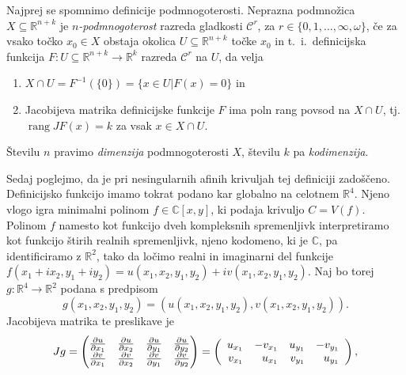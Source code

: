 \documentclass[mat1]{fmfdelo}
\newcommand{\tikzmark}[1]{\tikz[overlay,remember picture,baseline=(#1.base)]
  \node (#1) {\strut};}
\numberwithin{equation}{section}
\newcommand{\R}{\mathbb R}
\newcommand{\C}{\mathbb C}
\newcommand{\pdv}[2][]{\frac{\partial#1}{\partial#2}}
\DeclareMathOperator{\rang}{rang}
\theoremstyle{definition}
\begin{document}
\begin{dokaz}
    Najprej se spomnimo definicije podmnogoterosti. Neprazna podmnožica $X \subseteq \R^{n+k}$ je \emph{$n$-podmnogoterost} razreda gladkosti $\mathcal{C}^r$, za $r \in \{0,1,\dots, \infty, \omega\}$, če za vsako točko $x_0 \in X$ obstaja okolica $U \subseteq \R^{n+k}$ točke $x_0$ in t.~i.\ definicijska funkcija $F: U \subseteq \R^{n+k} \to \R^k$ razreda $\mathcal{C}^r$ na $U$, da velja
    \begin{enumerate}
        \item $X \cap U = F^{-1}(\{0\}) = \{x \in U | F(x) = 0\}$ in
        \item Jacobijeva matrika definicijske funkcije $F$ ima poln rang povsod na $X \cap U$, tj. $\rang J F(x) = k$ za vsak $x \in X \cap U$.
    \end{enumerate}
    Številu $n$ pravimo \emph{dimenzija} podmnogoterosti $X$, številu $k$ pa \emph{kodimenzija}.
    \\
    \par
    Sedaj poglejmo, da je pri nesingularnih afinih krivuljah tej definiciji zadoščeno. Definicijsko funkcijo imamo tokrat podano kar globalno na celotnem $\R^4$. Njeno vlogo igra minimalni polinom $f \in \C[x,y]$, ki podaja krivuljo $C = V(f)$. Polinom $f$ namesto kot funkcijo dveh kompleksnih spremenljivk interpretiramo kot funkcijo štirih realnih spremenljivk, njeno kodomeno, ki je $\C$, pa identificiramo z $\R^2$, tako da ločimo realni in imaginarni del funkcije $f(x_1 + ix_2, y_1 + iy_2) = u(x_1,x_2,y_1,y_2) + iv(x_1,x_2,y_1,y_2)$. Naj bo torej $g: \R^4 \to \R^2$ podana s predpisom
    \[
        g(x_1,x_2,y_1,y_2) = (u(x_1,x_2,y_1,y_2), v(x_1,x_2,y_1,y_2)).
    \]
    Jacobijeva matrika te preslikave je
    \[
    Jg = 
    \begin{pmatrix}
        \pdv[u]{x_1} & \pdv[u]{x_2} & \pdv[u]{y_1} & \pdv[u]{y_2} \\
        \pdv[v]{x_1} & \pdv[v]{x_2} & \pdv[v]{y_1} & \pdv[v]{y_2}
    \end{pmatrix}
    =
    \left (
        \begin{array}{rrrr}
            u_{x_1} & -v_{x_1} & u_{y_1} & -v_{y_1} \\
            \tikzmark{lower1} v_{x_1} & u_{x_1}\tikzmark{lower2} & \tikzmark{lower3} v_{y_1} & u_{y_1} \tikzmark{lower4}\\
        \end{array}
    \right ),
    \]
        

\end{dokaz}
\end{document}
